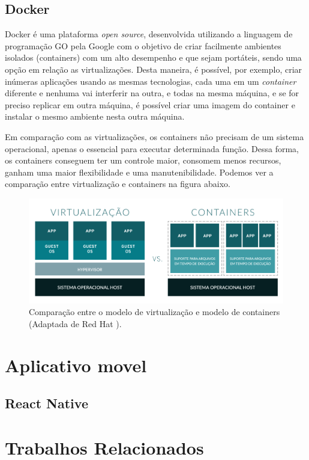 
\subsection{Docker}
\label{fund:docker}
Docker é uma plataforma \textit{open source}, desenvolvida utilizando a linguagem de programação GO pela Google com o objetivo de criar facilmente  ambientes isolados (containers) com um alto desempenho e que sejam portáteis, sendo uma opção em relação as virtualizações. Desta maneira, é possível, por exemplo, criar inúmeras aplicações usando as mesmas tecnologias, cada uma em um \textit{container} diferente e nenhuma vai interferir na outra, e todas na mesma máquina, e se for preciso replicar em outra máquina, é possível criar uma imagem do container e instalar o mesmo ambiente nesta outra máquina.

Em comparação com as virtualizações, os containers não precisam de um sistema operacional, apenas o essencial para executar determinada função. Dessa forma, os containers conseguem ter um controle maior, consomem menos recursos, ganham uma maior flexibilidade e uma manutenibilidade. Podemos ver a comparação entre virtualização e containers na figura abaixo.

\begin{figure}[!ht]
\centering
\includegraphics[width=.80\textwidth]{assets/virtualization-vs-containers.png} 
\caption{Comparação entre o modelo de virtualização e modelo de containers (Adaptada de Red Hat \cite{redhat2020Containers}).}
\label{fig:virtualization-vs-containers}
\end{figure}


\section{Aplicativo movel}
\label{fund:app}

\subsection{React Native}
\label{fund:react-native}

\section{Trabalhos Relacionados}
\label{fund:trabalhos-relacionados}